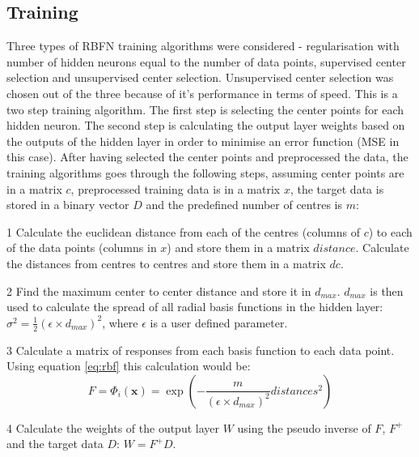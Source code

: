 \documentclass[a4paper, 11pt]{article}
\begin{document}
\subsection{Training}
Three types of RBFN training algorithms were considered - regularisation with number of hidden neurons equal to the number of data points, supervised center selection and unsupervised center selection. Unsupervised center selection was chosen out of the three because of it's performance in terms of speed. This is a two step training algorithm. The first step is selecting the center points for each hidden neuron. The second step is  calculating the output layer weights based on the outputs of the hidden layer in order to minimise an error function (MSE in this case). After having selected the center points and preprocessed the data, the training algorithms goes through the following steps, assuming center points are in a matrix $c$, preprocessed training data is in a matrix $x$, the target data is stored in a binary vector $D$ and the predefined number of centres is $m$:
\begin{list}{•}{•}
\item[1] Calculate the euclidean distance from each of the centres (columns of $c$) to each of the data points (columns in $x$) and store them in a matrix $distance$. Calculate the distances from centres to centres and store them in a matrix $dc$.  
\item[2] Find the maximum center to center distance and store it in $d_{max}$. $d_{max}$ is then used to calculate the spread of all radial basis functions in the hidden layer: $\sigma^2 = \frac{1}{2}(\epsilon \times d_{max})^2$, where $\epsilon$ is a user defined parameter. 
\item[3] Calculate a matrix of responses from each basis function to each data point. Using equation \ref{eq:rbf} this calculation would be:
\begin{equation}
F = \Phi_i(\boldsymbol{x}) = \exp\left(-\frac{m}{(\epsilon \times d_{max})^2} distances^2 \right)  
\end{equation}
\item[4] Calculate the weights of the output layer $W$ using the pseudo inverse of $F$, $F^+$ and the target data $D$: $W= F^+D$.
\end{list}
\end{document}
